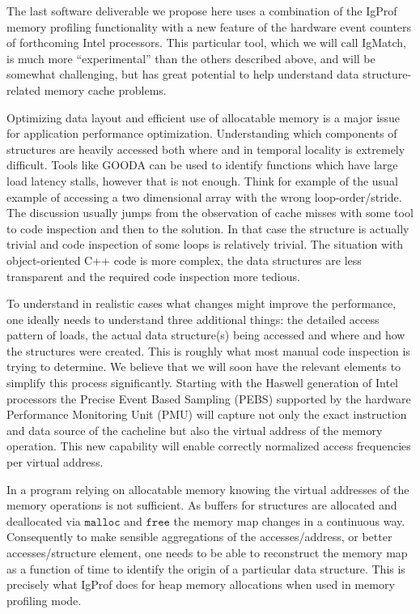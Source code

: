\documentclass[notitlepage,letter,12pt]{article}
\begin{document}
The last software deliverable we propose here uses a combination
of the IgProf memory profiling functionality with a new feature of the 
hardware event counters of forthcoming Intel processors. This particular
tool, which we will call IgMatch, is much more ``experimental'' than the 
others described above, and will be somewhat challenging, but has great
potential to help understand data structure-related memory cache problems.

Optimizing data layout and efficient use of allocatable memory is
a major issue for application performance optimization. Understanding
which components of structures are heavily accessed both where and
in temporal locality is extremely difficult. Tools like GOODA can
be used to identify functions which have large load latency stalls,
however that is not enough.  Think for example of the usual example
of accessing a two dimensional array with the wrong loop-order/stride.
The discussion usually jumps from the observation of cache misses
with some tool to code inspection and then to the solution. In that
case the structure is actually trivial and code inspection of some
loops is relatively trivial. The situation with object-oriented C++
code is more complex,  the data structures are less transparent and
the required code inspection more tedious.

To understand in realistic cases what changes  might improve the
performance, one ideally needs to understand three additional things:
the detailed access pattern of loads, the actual data structure(s) being
accessed and where and how the structures were created.
This is roughly what most manual code inspection is trying to
determine. We believe that we will soon have the relevant elements
to simplify this process significantly. Starting with the Haswell
generation of Intel processors the Precise Event Based Sampling
(PEBS) supported by the hardware Performance Monitoring Unit (PMU)
will capture not only the exact instruction and data source of the
cacheline but also the virtual address of the memory operation.
This new capability will enable correctly normalized access frequencies
per virtual address.

In a program relying on allocatable memory knowing the virtual
addresses of the memory operations is not sufficient. As buffers
for structures are allocated and deallocated via $\texttt{malloc}$ and 
$\texttt{free}$ the memory map changes in a
continuous way. Consequently to make sensible aggregations of the
accesses/address, or better accesses/structure element, one needs
to be able to reconstruct the memory map as a function of time to
identify the origin of a particular data structure. This is precisely
what IgProf does for heap memory allocations when used in memory
profiling mode.
\end{document}
